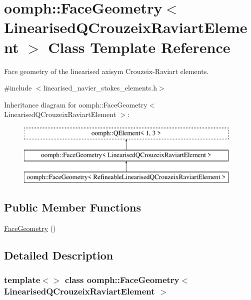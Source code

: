 \hypertarget{classoomph_1_1FaceGeometry_3_01LinearisedQCrouzeixRaviartElement_01_4}{}\section{oomph\+:\+:Face\+Geometry$<$ Linearised\+Q\+Crouzeix\+Raviart\+Element $>$ Class Template Reference}
\label{classoomph_1_1FaceGeometry_3_01LinearisedQCrouzeixRaviartElement_01_4}


Face geometry of the linearised axisym Crouzeix-\/\+Raviart elements.  




{\ttfamily \#include $<$linearised\+\_\+navier\+\_\+stokes\+\_\+elements.\+h$>$}

Inheritance diagram for oomph\+:\+:Face\+Geometry$<$ Linearised\+Q\+Crouzeix\+Raviart\+Element $>$\+:\begin{figure}[H]
\begin{center}
\leavevmode
\includegraphics[height=3.000000cm]{classoomph_1_1FaceGeometry_3_01LinearisedQCrouzeixRaviartElement_01_4}
\end{center}
\end{figure}
\subsection*{Public Member Functions}
\begin{DoxyCompactItemize}
\item 
\hyperlink{classoomph_1_1FaceGeometry_3_01LinearisedQCrouzeixRaviartElement_01_4_a4a7413d3dcb53357b62feaa6b09308e7}{Face\+Geometry} ()
\end{DoxyCompactItemize}


\subsection{Detailed Description}
\subsubsection*{template$<$$>$\newline
class oomph\+::\+Face\+Geometry$<$ Linearised\+Q\+Crouzeix\+Raviart\+Element $>$}

